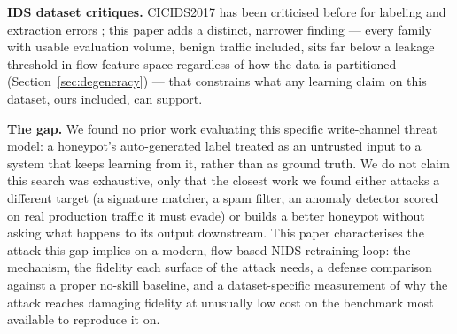 \textbf{IDS dataset critiques.} CICIDS2017 \cite{sharafaldin2018toward} has been criticised
before for labeling and extraction errors
\cite{engelen2021troubleshooting,lanvin2022errors,rosay2022network}; this paper adds a distinct,
narrower finding — every family with usable evaluation volume, benign traffic included, sits far
below a leakage threshold in flow-feature space regardless of how the data is partitioned
(Section~\ref{sec:degeneracy}) — that constrains what any learning claim on this dataset, ours
included, can support.

\textbf{The gap.} We found no prior work evaluating this specific write-channel threat model: a
honeypot's auto-generated label treated as an untrusted input to a system that keeps learning
from it, rather than as ground truth. We do not claim this search was exhaustive, only that the
closest work we found either attacks a different target (a signature matcher, a spam filter, an
anomaly detector scored on real production traffic it must evade) or builds a better honeypot
without asking what happens to its output downstream. This paper characterises the attack this
gap implies on a modern, flow-based NIDS retraining loop: the mechanism, the fidelity each
surface of the attack needs, a defense comparison against a proper no-skill baseline, and a
dataset-specific measurement of why the attack reaches damaging fidelity at unusually low cost on
the benchmark most available to reproduce it on.
